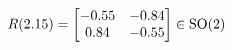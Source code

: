 \documentclass[preview]{standalone}
\begin{document}
\begin{align*}
\special{dvisvgm:raw <g id='unique000'>}R(2.15) = \begin{bmatrix} -0.55 & -0.84 \\ 0.84 & -0.55 \end{bmatrix} \in \text{SO}(2)\special{dvisvgm:raw </g>}
\end{align*}
\end{document}

